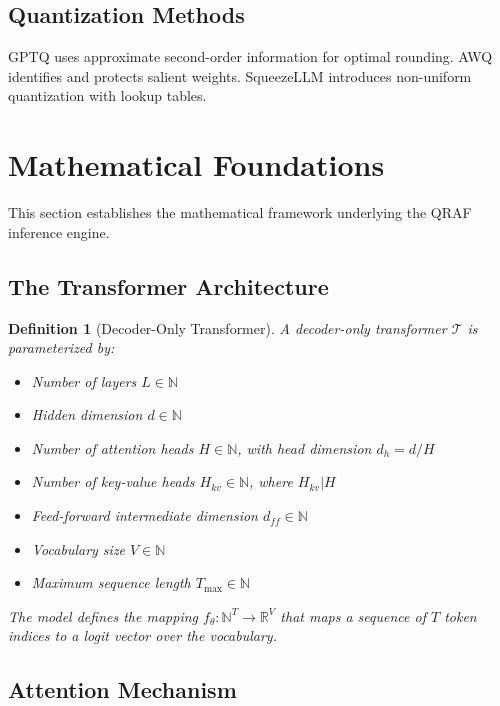 \documentclass[12pt,a4paper]{article}
\newtheorem{definition}{Definition}[section]
\begin{document}
\subsection{Quantization Methods}

GPTQ \citep{frantar2023gptq} uses approximate second-order information for optimal rounding. AWQ \citep{lin2024awq} identifies and protects salient weights. SqueezeLLM \citep{kim2024squeezellm} introduces non-uniform quantization with lookup tables.

\section{Mathematical Foundations}
\label{sec:math}

This section establishes the mathematical framework underlying the QRAF inference engine.

\subsection{The Transformer Architecture}

\begin{definition}[Decoder-Only Transformer]
\label{def:transformer}
A decoder-only transformer $\mathcal{T}$ is parameterized by:
\begin{itemize}[nosep]
    \item Number of layers $L \in \mathbb{N}$
    \item Hidden dimension $d \in \mathbb{N}$
    \item Number of attention heads $H \in \mathbb{N}$, with head dimension $d_h = d / H$
    \item Number of key-value heads $H_{kv} \in \mathbb{N}$, where $H_{kv} | H$
    \item Feed-forward intermediate dimension $d_{ff} \in \mathbb{N}$
    \item Vocabulary size $V \in \mathbb{N}$
    \item Maximum sequence length $T_{\max} \in \mathbb{N}$
\end{itemize}
The model defines the mapping $f_\theta: \mathbb{N}^{T} \to \mathbb{R}^{V}$ that maps a sequence of $T$ token indices to a logit vector over the vocabulary.
\end{definition}

\subsection{Attention Mechanism}
\end{document}
